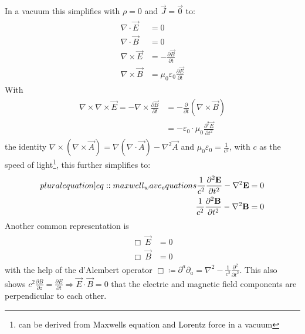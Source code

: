% 
In a vacuum this simplifies with $\rho = 0$ and $\vec{J} = \vec{0}$ to:
% 
\begin{align}
\begin{split} \label{eq::maxwell_vacuum}
  \nabla \cdot \vec{E} &= 0 \quad\\
  \nabla \cdot \vec{B} &= 0 \quad\\
  \nabla \times \vec{E} &= -\frac{\partial\vec B}{\partial t}\\
  \nabla \times \vec{B} &= \mu_0\varepsilon_0 \frac{\partial\vec E}{\partial t}
  \end{split}
\end{align}
% 
With 
\begin{align}
\begin{split} 
    \nabla \times \nabla \times \vec{E} = -\nabla \times \frac{\partial \vec{B}} {\partial t} &= -\frac{\partial} {\partial t} \left( \nabla \times  \vec{B} \right)\\
    &= -\varepsilon_0 \cdot \mu_0 \frac{\partial^2 \vec{E}}{\partial t^2}
\end{split}
\end{align}
% 
the identity $\nabla \times \left( \nabla \times \vec{A} \right) = \nabla(\nabla \cdot \vec{A}) - \nabla^{2}\vec{A}$ and $\mu_0\varepsilon_0 = \frac{1}{c^2}$, with $c$ as the speed of light\footnote{can be derived from Maxwells equation and Lorentz force in a vacuum}, this further simplifies to:
% 
\begin{align}
\begin{split} \label[pluralequation]{eq::maxwell_wave_equations}
  \frac{1}{c^2} \frac{\partial^2 \vec{E}}{\partial t^2} - \nabla^2 \vec{E} &= 0 \\
  \frac{1}{c^2} \frac{\partial^2 \vec{B}}{\partial t^2} - \nabla^2 \vec{B} &= 0
\end{split}
\end{align}
% 
Another common representation is
% 
\begin{align}
\begin{split} \label{eq::maxwell_wave_equations_box}
  \Box \ \vec{E} &= 0 \\
  \Box \ \vec{B} &= 0
\end{split}
\end{align}
% 
with the help of the d'Alembert operator $\Box \coloneqq \partial^a\partial_a = \nabla^2 - \frac{1}{c^2} \frac{\partial^2}{\partial t^2}$.
% 
This also shows $c^2  \frac{\partial B} {\partial z} = \frac{\partial E}{\partial t} \Rightarrow \vec{E} \cdot \vec{B} = 0$ that the electric and magnetic field components are perpendicular to each other.
% 
